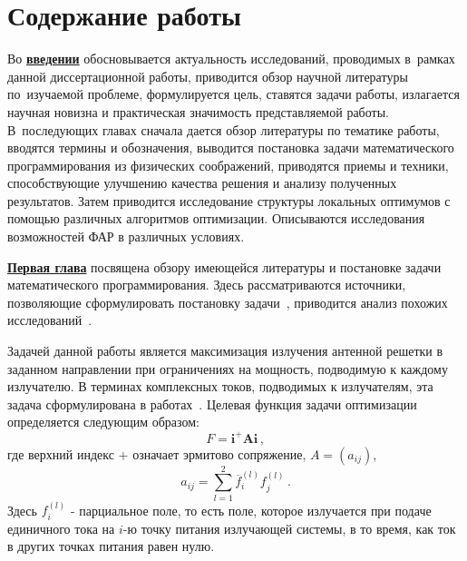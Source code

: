 \section*{Содержание работы}
Во \underline{\textbf{введении}} обосновывается актуальность
исследований, проводимых в~рамках данной диссертационной работы,
приводится обзор научной литературы по~изучаемой проблеме,
формулируется цель, ставятся задачи работы, излагается научная новизна
и практическая значимость представляемой работы. В~последующих главах
сначала дается обзор литературы по тематике работы, вводятся термины и обозначения, выводится постановка
задачи математического программирования из физических соображений, приводятся
приемы и техники, способствующие улучшению качества решения и анализу полученных
результатов. Затем приводится исследование структуры локальных оптимумов с помощью различных алгоритмов оптимизации. Описываются исследования возможностей ФАР в различных условиях.


\underline{\textbf{Первая глава}} посвящена обзору имеющейся литературы и постановке задачи математического программирования. Здесь рассматриваются источники, позволяющие сформулировать постановку задачи~\cite{sazonov:PAA, yurkov:farkv}, приводится анализ похожих исследований~\cite{luo:sdp}.

Задачей данной работы является максимизация излучения антенной решетки в заданном направлении при ограничениях на мощность, подводимую к каждому излучателю. В терминах комплексных токов, подводимых к излучателям, эта задача сформулирована в работах~\cite{yurkov:farkv,yurkov:knd}. Целевая функция задачи оптимизации определяется следующим образом:
%
    \begin{equation}
        F = \textbf{i}^{+}\textbf{Ai} \, ,
        \label{eq:F}
    \end{equation}
%
где верхний индекс $+$ означает эрмитово сопряжение, $A = (a_{ij})$,
%
     \begin{equation}
        a_{ij} = \sum_{l=1}^2\overline{f}_{i}^{(l)}f_{j}^{(l)}
        \label{eq:A} \, .
    \end{equation}
%
Здесь $f_i^{(l)}$ - парциальное поле, то есть поле, которое излучается при подаче единичного тока на $i$-ю точку питания излучающей системы, в то время, как ток в других точках питания равен нулю.

